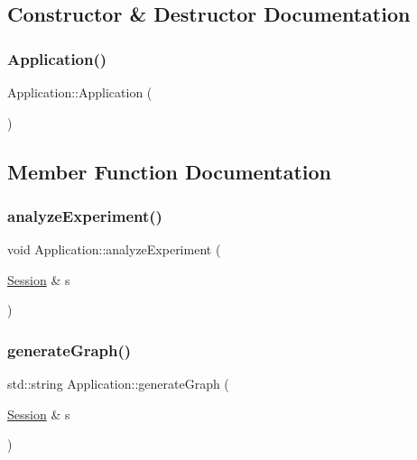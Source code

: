 \subsection{Constructor \& Destructor Documentation}
\mbox{\label{class_application_afa8cc05ce6b6092be5ecdfdae44e05f8_afa8cc05ce6b6092be5ecdfdae44e05f8}} 
\subsubsection{\texorpdfstring{Application()}{Application()}}
{\footnotesize\ttfamily Application\+::\+Application (\begin{DoxyParamCaption}{ }\end{DoxyParamCaption})\hspace{0.3cm}{\ttfamily [inline]}}



\subsection{Member Function Documentation}
\mbox{\label{class_application_ae0d3919fe03bae0b3ce31ef4be49374d_ae0d3919fe03bae0b3ce31ef4be49374d}} 
\subsubsection{\texorpdfstring{analyze\+Experiment()}{analyzeExperiment()}}
{\footnotesize\ttfamily void Application\+::analyze\+Experiment (\begin{DoxyParamCaption}\item[{\hyperlink{struct_session}{Session} \&}]{s }\end{DoxyParamCaption})}

\mbox{\label{class_application_a169c37596e9a7a9e0546700876adcbe7_a169c37596e9a7a9e0546700876adcbe7}} 
\subsubsection{\texorpdfstring{generate\+Graph()}{generateGraph()}}
{\footnotesize\ttfamily std\+::string Application\+::generate\+Graph (\begin{DoxyParamCaption}\item[{\hyperlink{struct_session}{Session} \&}]{s }\end{DoxyParamCaption})}

